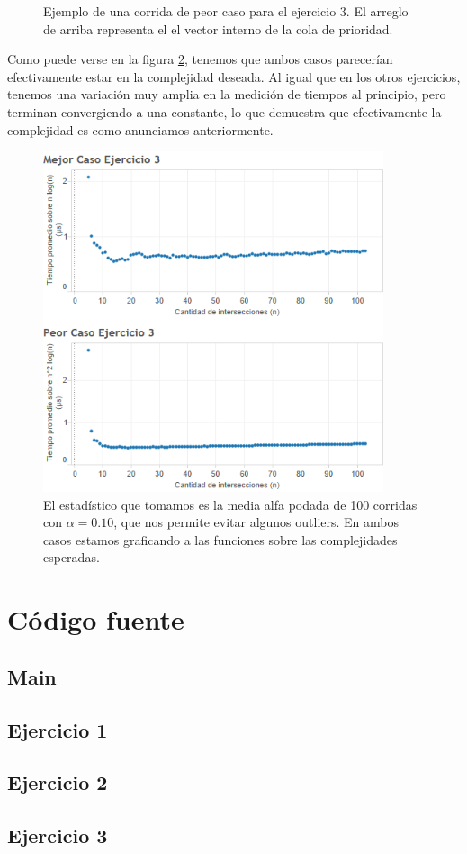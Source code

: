 \documentclass{article}
\theoremstyle{definition}
\theoremstyle{remark}
\begin{document}
\begin{figure}
    \caption{Ejemplo de una corrida de peor caso para el ejercicio 3. El arreglo de arriba representa el el vector interno de la cola de prioridad. \label{grf:ex3-worst}}
\end{figure}

Como puede verse en la figura \ref{grf:ex3}, tenemos que ambos casos parecerían efectivamente estar en la complejidad deseada. Al igual que en los otros ejercicios, tenemos una variación muy amplia en la medición de tiempos al principio, pero terminan convergiendo a una constante, lo que demuestra que efectivamente la complejidad es como anunciamos anteriormente.

\begin{figure}
\centering
\includegraphics[width=10cm]{ex3}
\caption{El estadístico que tomamos es la media alfa podada de 100 corridas con $\alpha = 0.10$, que nos permite evitar algunos outliers. En ambos casos estamos graficando a las funciones sobre las complejidades esperadas.\label{grf:ex3}}
\end{figure}

\pagebreak

\section{Código fuente}

\subsection{Main}
%

\subsection{Ejercicio 1}
%
%

\subsection{Ejercicio 2}
%
%

\subsection{Ejercicio 3}
%
%
\end{document}
